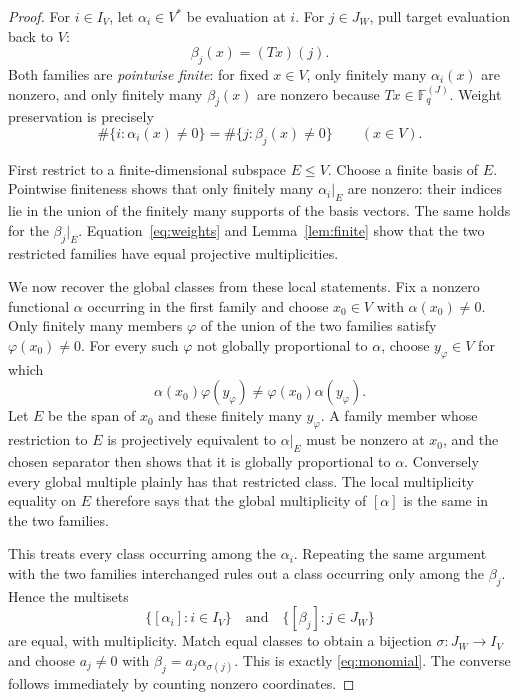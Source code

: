 \documentclass[11pt]{article}
\newcommand{\F}{\mathbb F}
\begin{document}
\begin{proof}
For $i\in I_V$, let $\alpha_i\in V^*$ be evaluation at $i$.  For
$j\in J_W$, pull target evaluation back to $V$:
\[
 \beta_j(x)=(Tx)(j).
\]
Both families are \emph{pointwise finite}: for fixed $x\in V$, only finitely
many $\alpha_i(x)$ are nonzero, and only finitely many $\beta_j(x)$ are
nonzero because $Tx\in\F_q^{(J)}$.  Weight preservation is precisely
\begin{equation}\label{eq:weights}
 \#\{i:\alpha_i(x)\ne0\}=\#\{j:\beta_j(x)\ne0\}
 \qquad(x\in V).
\end{equation}

First restrict to a finite-dimensional subspace $E\leq V$.  Choose a finite
basis of $E$.  Pointwise finiteness shows that only finitely many
$\alpha_i|_E$ are nonzero: their indices lie in the union of the finitely many
supports of the basis vectors.  The same holds for the $\beta_j|_E$.
Equation~\eqref{eq:weights} and Lemma~\ref{lem:finite} show that the two
restricted families have equal projective multiplicities.

We now recover the global classes from these local statements.  Fix a
nonzero functional $\alpha$ occurring in the first family and choose
$x_0\in V$ with $\alpha(x_0)\ne0$.  Only finitely many members $\varphi$ of
the union of the two families satisfy $\varphi(x_0)\ne0$.  For every such
$\varphi$ not globally proportional to $\alpha$, choose $y_\varphi\in V$
for which
\[
 \alpha(x_0)\varphi(y_\varphi)
 \ne \varphi(x_0)\alpha(y_\varphi).
\]
Let $E$ be the span of $x_0$ and these finitely many $y_\varphi$.  A family
member whose restriction to $E$ is projectively equivalent to $\alpha|_E$
must be nonzero at $x_0$, and the chosen separator then shows that it is
globally proportional to $\alpha$.  Conversely every global multiple plainly
has that restricted class.  The local multiplicity equality on $E$ therefore
says that the global multiplicity of $[\alpha]$ is the same in the two
families.

This treats every class occurring among the $\alpha_i$.  Repeating the same
argument with the two families interchanged rules out a class occurring only
among the $\beta_j$.  Hence the multisets
\[
 \{[\alpha_i]:i\in I_V\}
 \quad\text{and}\quad
 \{[\beta_j]:j\in J_W\}
\]
are equal, with multiplicity.  Match equal classes to obtain a bijection
$\sigma:J_W\to I_V$ and choose $a_j\ne0$ with
$\beta_j=a_j\alpha_{\sigma(j)}$.  This is exactly
\eqref{eq:monomial}.  The converse follows immediately by counting nonzero
coordinates.
\end{proof}
\end{document}
